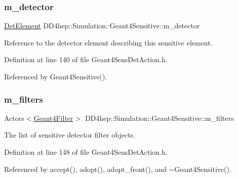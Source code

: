 \subsubsection{\texorpdfstring{m\+\_\+detector}{m\_detector}}
{\footnotesize\ttfamily \hyperlink{class_d_d4hep_1_1_simulation_1_1_geant4_sensitive_a1cb1af5fb1194be1e1c1137f1e54272b}{Det\+Element} D\+D4hep\+::\+Simulation\+::\+Geant4\+Sensitive\+::m\+\_\+detector\hspace{0.3cm}{\ttfamily [protected]}}



Reference to the detector element describing this sensitive element. 



Definition at line 140 of file Geant4\+Sens\+Det\+Action.\+h.



Referenced by Geant4\+Sensitive().

\hypertarget{class_d_d4hep_1_1_simulation_1_1_geant4_sensitive_a7486440af0fb52c3ab233544262d2c95}{}\label{class_d_d4hep_1_1_simulation_1_1_geant4_sensitive_a7486440af0fb52c3ab233544262d2c95} 
\subsubsection{\texorpdfstring{m\+\_\+filters}{m\_filters}}
{\footnotesize\ttfamily Actors$<$\hyperlink{class_d_d4hep_1_1_simulation_1_1_geant4_filter}{Geant4\+Filter}$>$ D\+D4hep\+::\+Simulation\+::\+Geant4\+Sensitive\+::m\+\_\+filters\hspace{0.3cm}{\ttfamily [protected]}}



The list of sensitive detector filter objects. 



Definition at line 148 of file Geant4\+Sens\+Det\+Action.\+h.



Referenced by accept(), adopt(), adopt\+\_\+front(), and $\sim$\+Geant4\+Sensitive().

\hypertarget{class_d_d4hep_1_1_simulation_1_1_geant4_sensitive_a0dca1438c83ccee54eb9458bf12220b1}{}\label{class_d_d4hep_1_1_simulation_1_1_geant4_sensitive_a0dca1438c83ccee54eb9458bf12220b1} 
